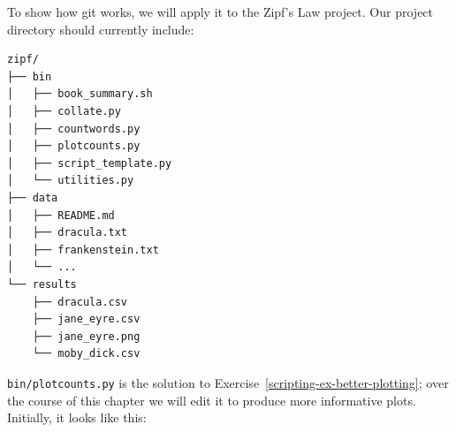 \documentclass[
]{krantz}
\begin{document}
To show how git works,
we will apply it to the Zipf's Law project.
Our project directory should currently include:

\begin{verbatim}
zipf/
├── bin
│   ├── book_summary.sh
│   ├── collate.py
│   ├── countwords.py
│   ├── plotcounts.py
│   ├── script_template.py
│   └── utilities.py
├── data
│   ├── README.md
│   ├── dracula.txt
│   ├── frankenstein.txt
│   └── ...
└── results
    ├── dracula.csv
    ├── jane_eyre.csv
    ├── jane_eyre.png
    └── moby_dick.csv
\end{verbatim}

\texttt{bin/plotcounts.py} is the solution to Exercise~\ref{scripting-ex-better-plotting};
over the course of this chapter
we will edit it to produce more informative plots.
Initially,
it looks like this:
\end{document}
